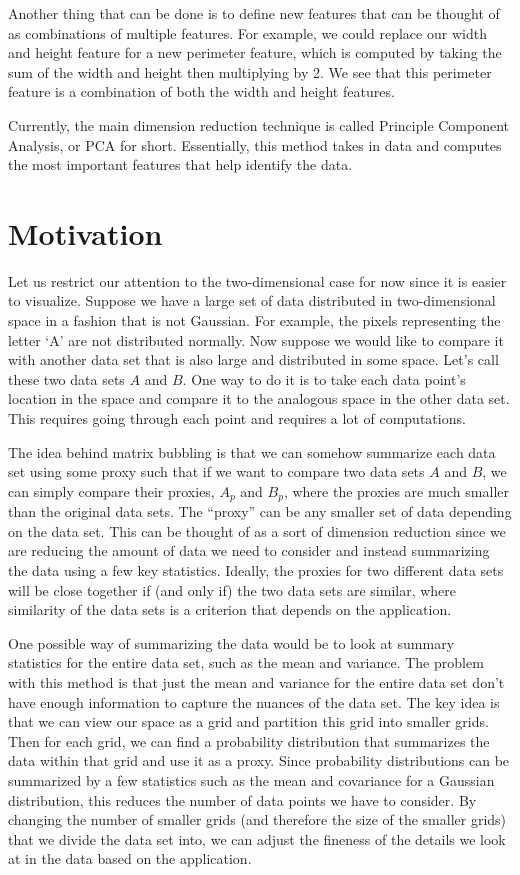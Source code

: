 \documentclass{article}
\begin{document}
Another thing that can be done is to define new features that can be thought of
as combinations of multiple features. For example, we could replace our width
and height feature for a new perimeter feature, which is computed by taking the
sum of the width and height then multiplying by 2. We see that this perimeter
feature is a combination of both the width and height features.

Currently, the main dimension reduction technique is called Principle Component
Analysis, or PCA for short. Essentially, this method takes in data and computes
the most important features that help identify the data.

\section{Motivation}

Let us restrict our attention to the two-dimensional case for now since it is
easier to visualize. Suppose we have a large set of data distributed in
two-dimensional space in a fashion that is not Gaussian. For example, the
pixels representing the letter `A' are not distributed normally. Now suppose we
would like to compare it with another data set that is also large and
distributed in some space. Let's call these two data sets $A$ and $B$. One way
to do it is to take each data point's location in the space and compare it to
the analogous space in the other data set. This requires going through each
point and requires a lot of computations.

The idea behind matrix bubbling is that we can somehow summarize each data set
using some proxy such that if we want to compare two data sets $A$ and $B$, we
can simply compare their proxies, $A_p$ and $B_p$, where the proxies are much
smaller than the original data sets. The ``proxy'' can be any smaller set of
data depending on the data set. This can be thought of as a sort of dimension
reduction since we are reducing the amount of data we need to consider and
instead summarizing the data using a few key statistics. Ideally, the proxies
for two different data sets will be close together if (and only if) the two
data sets are similar, where similarity of the data sets is a criterion that
depends on the application.

One possible way of summarizing the data would be to look at summary statistics
for the entire data set, such as the mean and variance. The problem with this
method is that just the mean and variance for the entire data set don't have
enough information to capture the nuances of the data set. The key idea is that
we can view our space as a grid and partition this grid into smaller grids.
Then for each grid, we can find a probability distribution that summarizes the
data within that grid and use it as a proxy. Since probability distributions
can be summarized by a few statistics such as the mean and covariance for a
Gaussian distribution, this reduces the number of data points we have to
consider. By changing the number of smaller grids (and therefore the size of
the smaller grids) that we divide the data set into, we can adjust the fineness
of the details we look at in the data based on the application.
\end{document}

